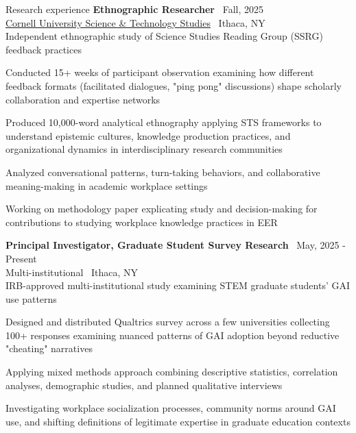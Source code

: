 \documentclass{resume}
\begin{document}
\begin{rSection}{Research experience}
{\bf Ethnographic Researcher} \hfill {\ Fall, 2025}\\
{\href{https://sts.cornell.edu/}{Cornell University Science \& Technology Studies}} \hfill {\ {Ithaca, NY}}\\
Independent ethnographic study of Science Studies Reading Group (SSRG) feedback practices
\begin{cvitems}
    \item Conducted 15+ weeks of participant observation examining how different feedback formats (facilitated dialogues, "ping pong" discussions) shape scholarly collaboration and expertise networks
    \item Produced 10,000-word analytical ethnography applying STS frameworks to understand epistemic cultures, knowledge production practices, and organizational dynamics in interdisciplinary research communities
    \item Analyzed conversational patterns, turn-taking behaviors, and collaborative meaning-making in academic workplace settings
    \item Working on methodology paper explicating study and decision-making for contributions to studying workplace knowledge practices in EER
\end{cvitems}

{\bf Principal Investigator, Graduate Student Survey Research} \hfill {\ May, 2025 - Present}\\
{Multi-institutional} \hfill {\ Ithaca, NY}\\
IRB-approved multi-institutional study examining STEM graduate students' GAI use patterns
\begin{cvitems}
    \item Designed and distributed Qualtrics survey across a few universities collecting 100+ responses examining nuanced patterns of GAI adoption beyond reductive "cheating" narratives
    \item Applying mixed methods approach combining descriptive statistics, correlation analyses, demographic studies, and planned qualitative interviews
    \item Investigating workplace socialization processes, community norms around GAI use, and shifting definitions of legitimate expertise in graduate education contexts
\end{cvitems}

\end{rSection}

\end{document}
